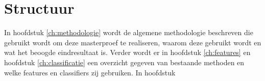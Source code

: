 \section{Structuur}
In hoofdstuk \ref{ch:methodologie} wordt de algemene methodologie beschreven die gebruikt wordt om deze masterproef te realiseren, waarom deze gebruikt wordt en wat het beoogde eindresultaat is. Verder wordt er in hoofdstuk \ref{ch:features} en hoofdstuk \ref{ch:classificatie} een overzicht gegeven van bestaande methoden en welke features en classifiers zij gebruiken. In hoofdstuk 
